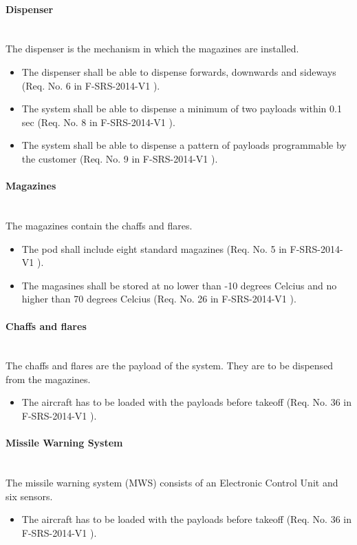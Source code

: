 \paragraph{Dispenser}\mbox{}\\
The dispenser is the mechanism in which the magazines are installed.
\begin{itemize}
\item The dispenser shall be able to dispense forwards, downwards and sideways (Req. No. 6 in F-SRS-2014-V1 ). 
\item The system shall be able to dispense a minimum of two payloads within 0.1 sec (Req. No. 8 in F-SRS-2014-V1 ).
\item The system shall be able to dispense a pattern of payloads programmable by the customer (Req. No. 9 in F-SRS-2014-V1 ).
\end{itemize}

\paragraph{Magazines}\mbox{}\\
The magazines contain the chaffs and flares.
\begin{itemize}
\item The pod shall include eight standard magazines (Req. No. 5 in F-SRS-2014-V1 ).
\item The magasines shall be stored at no lower than -10 degrees Celcius and no higher than 70 degrees Celcius (Req. No. 26 in F-SRS-2014-V1 ).
\end{itemize}

\paragraph{Chaffs and flares}\mbox{}\\
The chaffs and flares are the payload of the system. They are to be dispensed from the magazines.
\begin{itemize}
\item The aircraft has to be loaded with the payloads before takeoff (Req. No. 36 in F-SRS-2014-V1 ).
\end{itemize}

\paragraph{Missile Warning System}\mbox{}\\
The missile warning system (MWS) consists of an Electronic Control Unit and six sensors.
\begin{itemize}
\item The aircraft has to be loaded with the payloads before takeoff (Req. No. 36 in F-SRS-2014-V1 ).
\end{itemize}

